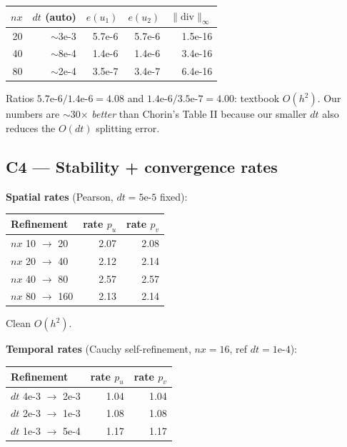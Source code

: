 \documentclass[11pt]{article}
\begin{document}
\begin{center}
\begin{tabular}{@{}rrrrr@{}}
\toprule
$nx$ & $dt$ (auto) & $e(u_1)$ & $e(u_2)$ & $\|\mathrm{div}\|_\infty$ \\
\midrule
20 & $\sim$3e-3 & 5.7e-6 & 5.7e-6 & 1.5e-16 \\
40 & $\sim$8e-4 & 1.4e-6 & 1.4e-6 & 3.4e-16 \\
80 & $\sim$2e-4 & 3.5e-7 & 3.4e-7 & 6.4e-16 \\
\bottomrule
\end{tabular}
\end{center}

Ratios $5.7\text{e-}6/1.4\text{e-}6 = 4.08$ and $1.4\text{e-}6/3.5\text{e-}7 = 4.00$: textbook $O(h^2)$. Our numbers are $\sim$30$\times$ \emph{better} than Chorin's Table II because our smaller $dt$ also reduces the $O(dt)$ splitting error.

\subsection{C4 --- Stability + convergence rates}

\textbf{Spatial rates} (Pearson, $dt = 5\text{e-}5$ fixed):
\begin{center}
\begin{tabular}{@{}lrr@{}}
\toprule
Refinement & rate $p_u$ & rate $p_v$ \\
\midrule
$nx$ 10 $\to$ 20 & 2.07 & 2.08 \\
$nx$ 20 $\to$ 40 & 2.12 & 2.14 \\
$nx$ 40 $\to$ 80 & 2.57 & 2.57 \\
$nx$ 80 $\to$ 160 & 2.13 & 2.14 \\
\bottomrule
\end{tabular}
\end{center}

Clean $O(h^2)$.

\textbf{Temporal rates} (Cauchy self-refinement, $nx=16$, ref $dt=1\text{e-}4$):
\begin{center}
\begin{tabular}{@{}lrr@{}}
\toprule
Refinement & rate $p_u$ & rate $p_v$ \\
\midrule
$dt$ 4e-3 $\to$ 2e-3 & 1.04 & 1.04 \\
$dt$ 2e-3 $\to$ 1e-3 & 1.08 & 1.08 \\
$dt$ 1e-3 $\to$ 5e-4 & 1.17 & 1.17 \\
\bottomrule
\end{tabular}
\end{center}
\end{document}
